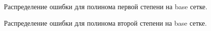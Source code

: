 \begin{figure}[H]
    \centering
    \caption{Распределение ошибки для полинома первой степени на base сетке.}
    \label{fig:15}
\end{figure}

\begin{figure}[H]
    \centering
    \caption{Распределение ошибки для полинома второй степени на base сетке.}
    \label{fig:16}
\end{figure}

